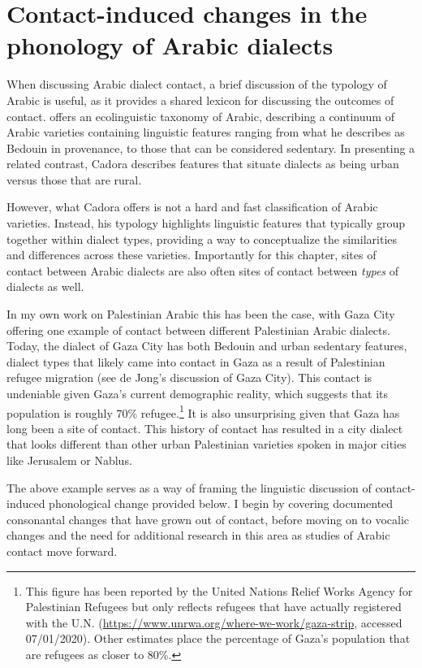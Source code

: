 \documentclass[output=paper]{langsci/langscibook}
\begin{document}
\section{Contact-induced changes in the phonology of Arabic dialects}

When discussing Arabic dialect contact, a brief discussion of the typology of Arabic is useful, as it provides a shared lexicon for discussing the outcomes of contact. \citet{Cadora1992} offers an ecolinguistic taxonomy of Arabic, describing a continuum of Arabic varieties containing linguistic features ranging from what he describes as Bedouin in provenance, to those that can be considered sedentary. In presenting a related contrast, Cadora describes features that situate dialects as being urban versus those that are rural. 

  However, what Cadora offers is not a hard and fast classification of Arabic varieties. Instead, his typology highlights linguistic features that typically group together within dialect types, providing a way to conceptualize the similarities and differences across these varieties. Importantly for this chapter, sites of contact between Arabic dialects are also often sites of contact between \textit{types} of dialects as well. 

  In my own work on Palestinian Arabic this has been the case, with Gaza City offering one example of contact between different Palestinian Arabic dialects. Today, the dialect of Gaza City has both Bedouin and urban sedentary features, dialect types that likely came into contact in Gaza as a result of Palestinian refugee migration (see de Jong's \citeyear{DeJong2000} discussion of Gaza City). This contact is undeniable given Gaza’s current demographic reality, which suggests that its population is roughly 70\% refugee.\footnote{This figure has been reported by the United Nations Relief Works Agency for Palestinian Refugees but only reflects refugees that have actually registered with the U.N. (\url{https://www.unrwa.org/where-we-work/gaza-strip}, accessed 07/01/2020). Other estimates place the percentage of Gaza’s population that are refugees as closer to 80\%.}  It is also unsurprising given that Gaza has long been a site of contact. This history of contact has resulted in a city dialect that looks different than other urban Palestinian varieties spoken in major cities like Jerusalem or Nablus. 

  The above example serves as a way of framing the linguistic discussion of contact-induced phonological change provided below. I begin by covering documented consonantal changes that have grown out of contact, before moving on to vocalic changes and the need for additional research in this area as studies of Arabic contact move forward. 
\end{document}
